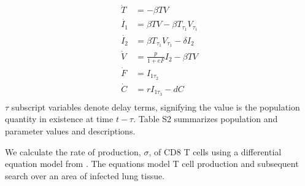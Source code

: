 \documentclass[preprint,10pt,authoryear]{elsarticle}
\begin{document}
{\footnotesize
\begin{equation*}
\begin{aligned}
\dot{T} &= - \beta T V \\
\dot{I_1} &= \beta T V - \beta T_{\tau_1}V_{\tau_1} \\
\dot{I_2} &= \beta T_{\tau_1}V_{\tau_1} - \delta I_2 \\
\dot{V} &= \frac{p}{1+eF} I_2  - \beta T V  \\
\dot{F} &=  I_{1 \tau_2} \\
\dot{C} &= r I_{1 \tau_3} - d C \\
\end{aligned}
\tag{Eq. 1}
\label{eq:dde}
\end{equation*}
\vspace{.05in}
}
$\tau$ subscript variables denote delay terms, signifying the value is the population quantity in existence at time $t - \tau$.  Table S2 summarizes population and parameter values and descriptions.






We calculate the rate of production, $\sigma$, of CD8 T cells using a differential equation model from \citep{Miao2010a}.  The equations model T cell production and subsequent search over an area of infected lung tissue.
\end{document}
